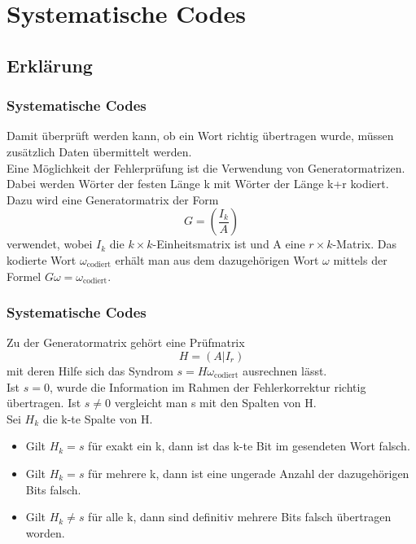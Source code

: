 \section{Systematische Codes}
\subsection{Erklärung}
\begin{frame}
	\frametitle{Systematische Codes}
	Damit überprüft werden kann, ob ein Wort richtig übertragen wurde, müssen zusätzlich Daten übermittelt werden.\\
	Eine Möglichkeit der Fehlerprüfung ist die Verwendung von Generatormatrizen.\\ 
	Dabei werden Wörter der festen Länge k mit Wörter der Länge k+r kodiert. Dazu wird eine Generatormatrix der Form \[G=\left(\frac{I_k}{A}\right)\] verwendet, wobei $I_k$ die $k \times k$-Einheitsmatrix ist und A eine $r \times k$-Matrix. Das kodierte Wort $\omega_{\text{codiert}}$ erhält man aus dem dazugehörigen Wort $\omega$ mittels der Formel $G\omega=\omega_{\text{codiert}}.$\\
\end{frame}
\begin{frame}
	\frametitle{Systematische Codes}
	Zu der Generatormatrix gehört eine Prüfmatrix \[H=\left(A|I_r\right)\] mit deren Hilfe sich das Syndrom $s=H\omega_{\text{codiert}}$ ausrechnen lässt.\\ Ist $s=0$, wurde die Information im Rahmen der Fehlerkorrektur richtig übertragen. Ist $s\not = 0$ vergleicht man s mit den Spalten von H.\\ Sei $H_k$ die k-te Spalte von H.
	\begin{itemize}
	\item Gilt $H_k=s$ für exakt ein k, dann ist das k-te Bit im gesendeten Wort falsch.
	\item Gilt $H_k=s$ für mehrere k, dann ist eine ungerade Anzahl der dazugehörigen Bits falsch.
	\item Gilt $H_k\not=s$ für alle k, dann sind definitiv mehrere Bits falsch übertragen worden.
	\end{itemize}
\end{frame}
